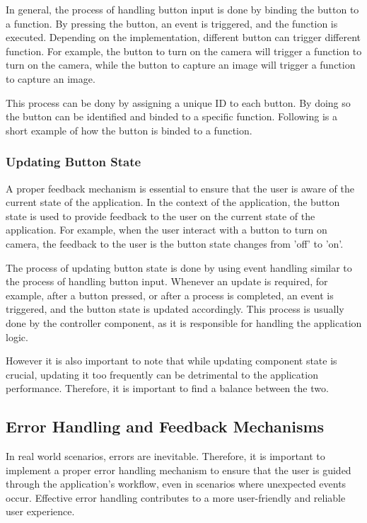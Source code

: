 In general, the process of handling button input is done by binding the button to a function. By pressing the button, an event is triggered, and the function is executed. Depending on the implementation, different button can trigger different function. For example, the button to turn on the camera will trigger a function to turn on the camera, while the button to capture an image will trigger a function to capture an image.

This process can be dony by assigning a unique ID to each button. By doing so the button can be identified and binded to a specific function. Following is a short example of how the button is binded to a function.

\subsubsection{Updating Button State}
A proper feedback mechanism is essential to ensure that the user is aware of the current state of the application. In the context of the application, the button state is used to provide feedback to the user on the current state of the application. For example, when the user interact with a button to turn on camera, the feedback to the user is the button state changes from 'off' to 'on'.

The process of updating button state is done by using event handling similar to the process of handling button input. Whenever an update is required, for example, after a button pressed, or after a process is completed, an event is triggered, and the button state is updated accordingly. This process is usually done by the controller component, as it is responsible for handling the application logic.

However it is also important to note that while updating component state is crucial, updating it too frequently can be detrimental to the application performance. Therefore, it is important to find a balance between the two.

\subsection{Error Handling and Feedback Mechanisms}
\label{subsec:error_handling_and_feedback_mechanisms}
In real world scenarios, errors are inevitable. Therefore, it is important to implement a proper error handling mechanism to ensure that the user is guided through the application's workflow, even in scenarios where unexpected events occur. Effective error handling contributes to a more user-friendly and reliable user experience.

